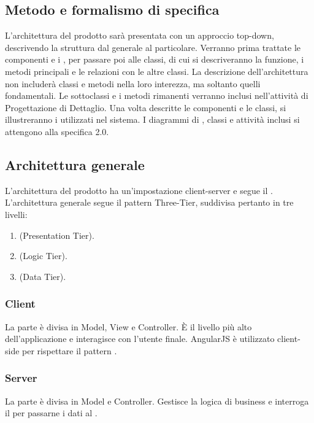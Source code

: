 \documentclass[a4paper, titlepage]{article}
\begin{document}
	\subsection{Metodo e formalismo di specifica}
	
	L'architettura del prodotto sarà presentata con un approccio top-down, descrivendo la struttura dal generale al particolare. Verranno prima trattate le componenti e i , per passare poi alle classi, di cui si descriveranno la funzione, i metodi principali e le relazioni con le altre classi. La descrizione dell'architettura non includerà classi e metodi nella loro interezza, ma soltanto quelli fondamentali. Le sottoclassi e i metodi rimanenti verranno inclusi nell'attività di Progettazione di Dettaglio.
	\newline
	Una volta descritte le componenti e le classi, si illustreranno i  utilizzati nel sistema. 
	\newline
	I diagrammi di , classi e attività inclusi si attengono alla specifica  2.0.
	
	\subsection{Architettura generale}
	L'architettura del prodotto ha un'impostazione client-server e segue il  . 
	\newline
	L'architettura generale segue il pattern Three-Tier, suddivisa pertanto in tre livelli:
	\begin{enumerate}
		\item {} (Presentation Tier).
		\item {} (Logic Tier).
		\item {} (Data Tier).
	\end{enumerate}
	
	\subsubsection{Client}
	La parte  è divisa in Model, View e Controller. È il livello più alto dell'applicazione e interagisce con l'utente finale.
	\newline
	AngularJS è utilizzato client-side per rispettare il pattern .
	
	\subsubsection{Server}
	La parte  è divisa in Model e Controller. Gestisce la logica di business e interroga il  per passarne i dati al .
	
\end{document}
